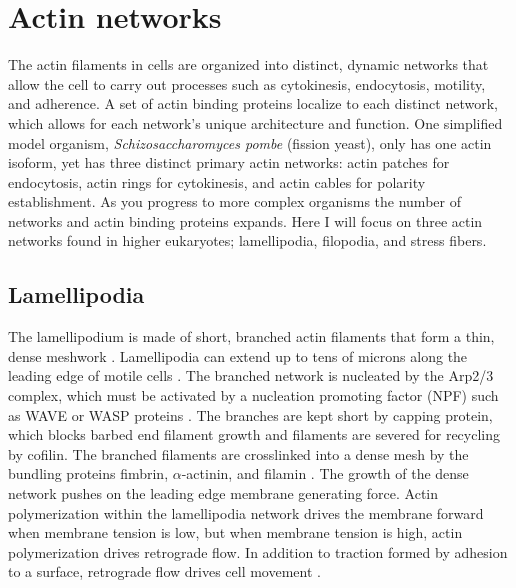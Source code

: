 \section{Actin networks}\label{network-intro}
The actin filaments in cells are organized into distinct, dynamic networks that allow the cell to carry out processes such as cytokinesis, endocytosis, motility, and adherence. A set of actin binding proteins localize to each distinct network, which allows for each network's unique architecture and function. One simplified model organism, \textit{Schizosaccharomyces pombe} (fission yeast), only has one actin isoform, yet has three distinct primary actin networks: actin patches for endocytosis, actin rings for cytokinesis, and actin cables for polarity establishment. As you progress to more complex organisms the number of networks and actin binding proteins expands. Here I will focus on three actin networks found in higher eukaryotes; lamellipodia, filopodia, and stress fibers. 

\subsection{Lamellipodia}\label{lamellipodia-intro}
The lamellipodium is made of short, branched actin filaments that form a thin, dense meshwork \citep{small_lamellipodium:_2002}. Lamellipodia can extend up to tens of microns along the leading edge of motile cells \citep{skau_specification_2015}. The branched network is nucleated by the Arp2/3 complex, which must be activated by a nucleation promoting factor (NPF) such as WAVE or WASP proteins \citep{blanchoin_actin_2014}. The branches are kept short by capping protein, which blocks barbed end filament growth and filaments are severed for recycling by cofilin. The branched filaments are crosslinked into a dense mesh by the bundling proteins fimbrin, $\alpha$-actinin, and filamin \citep{small_lamellipodium:_2002}. The growth of the dense network pushes on the leading edge membrane generating force. Actin polymerization within the lamellipodia network drives the membrane forward when membrane tension is low, but when membrane tension is high, actin polymerization drives retrograde flow. In addition to traction formed by adhesion to a surface, retrograde flow drives cell movement \citep{skau_specification_2015}.  

